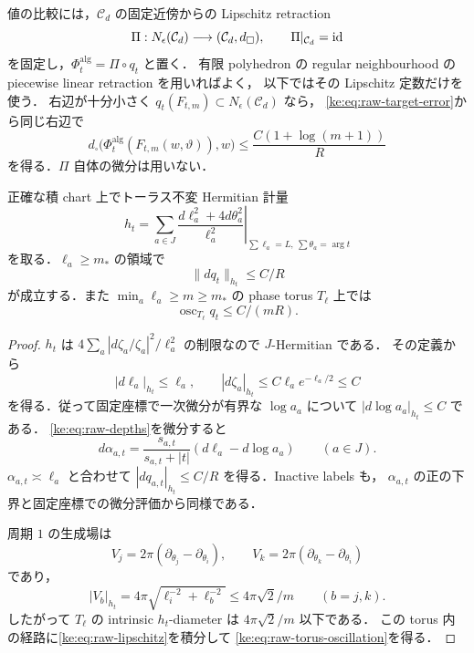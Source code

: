 値の比較には，$\mathcal C_d$ の固定近傍からの Lipschitz retraction
\[
 \Pi:N_\epsilon(\mathcal C_d)\longrightarrow(\mathcal C_d,d_\square),
 \qquad \Pi|_{\mathcal C_d}=\operatorname{id}
\]
を固定し，$\Phi_t^{\mathrm{alg}}=\Pi\circ q_t$ と置く．
有限 polyhedron の regular neighbourhood の piecewise linear retraction を用いればよく，
以下ではその Lipschitz 定数だけを使う．
右辺が十分小さく $q_t(F_{t,m})\subset N_\epsilon(\mathcal C_d)$ なら，
\eqref{ke:eq:raw-target-error}から同じ右辺で
\begin{equation}\label{ke:eq:algebraic-target-error}
 d_\square\bigl(\Phi_t^{\mathrm{alg}}(F_{t,m}(w,\vartheta)),w\bigr)
 \le\frac{C(1+\log(m+1))}{R}
\end{equation}
を得る．$\Pi$ 自体の微分は用いない．

\begin{lemma}
\label{ke:raw-lipschitz}
正確な積 chart 上でトーラス不変 Hermitian 計量
\begin{equation}\label{ke:eq:cusp-model}
 h_t=
 \left.\sum_{a\in J}\frac{d\ell_a^2+4d\theta_a^2}{\ell_a^2}
 \right|_{\sum\ell_a=L,\ \sum\theta_a=\arg t}
\end{equation}
を取る．$\ell_a\ge m_*$ の領域で
\begin{equation}\label{ke:eq:raw-lipschitz}
 \|dq_t\|_{h_t}\le C/R
\end{equation}
が成立する．また $\min_a\ell_a\ge m\ge m_*$ の phase torus $T_\ell$ 上では
\begin{equation}\label{ke:eq:raw-torus-oscillation}
 \operatorname{osc}_{T_\ell}q_t\le C/(mR).
\end{equation}
\end{lemma}
\begin{proof}
$h_t$ は $4\sum_a|d\zeta_a/\zeta_a|^2/\ell_a^2$ の制限なので $J$-Hermitian である．
その定義から
\[
 |d\ell_a|_{h_t}\le\ell_a,
 \qquad |d\zeta_a|_{h_t}\le C\ell_a e^{-\ell_a/2}\le C
\]
を得る．従って固定座標で一次微分が有界な $\log a_a$ について
$|d\log a_a|_{h_t}\le C$ である．
\eqref{ke:eq:raw-depths}を微分すると
\[
 d\alpha_{a,t}
 =\frac{s_{a,t}}{s_{a,t}+|t|}(d\ell_a-d\log a_a)
 \qquad(a\in J).
\]
$\alpha_{a,t}\asymp\ell_a$ と合わせて
$|dq_{a,t}|_{h_t}\le C/R$ を得る．Inactive labels も，
$\alpha_{a,t}$ の正の下界と固定座標での微分評価から同様である．

周期 $1$ の生成場は
\[
 V_j=2\pi(\partial_{\theta_j}-\partial_{\theta_i}),
 \qquad V_k=2\pi(\partial_{\theta_k}-\partial_{\theta_i})
\]
であり，
\begin{equation}\label{ke:eq:circle-generator-norm}
 |V_b|_{h_t}=4\pi\sqrt{\ell_i^{-2}+\ell_b^{-2}}
 \le4\pi\sqrt2/m\qquad(b=j,k).
\end{equation}
したがって $T_\ell$ の intrinsic $h_t$-diameter は $4\pi\sqrt2/m$ 以下である．
この torus 内の経路に\eqref{ke:eq:raw-lipschitz}を積分して
\eqref{ke:eq:raw-torus-oscillation}を得る．
\end{proof}

